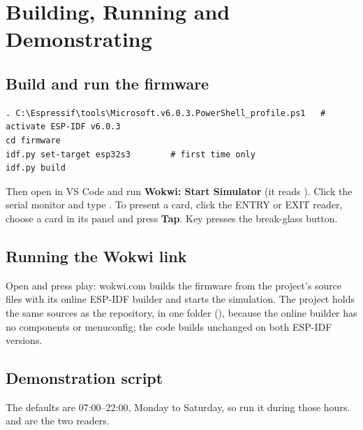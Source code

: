 \section{Building, Running and Demonstrating}
\label{app:build}

\subsection{Build and run the firmware}
\begin{lstlisting}[style=console]
. C:\Espressif\tools\Microsoft.v6.0.3.PowerShell_profile.ps1   # activate ESP-IDF v6.0.3
cd firmware
idf.py set-target esp32s3        # first time only
idf.py build
\end{lstlisting}
Then open  in VS Code and run \textbf{Wokwi: Start Simulator} (it reads
). Click the serial monitor and type . To present a card, click the
ENTRY or EXIT reader, choose a card in its panel and press \textbf{Tap}. Key  presses the
break-glass button.

\subsection{Running the Wokwi link}
\label{app:wokwi-link}
Open \wokwilink{} and press play: wokwi.com builds the firmware from the project's source files
with its online ESP-IDF builder and starts the simulation. The project holds the same sources as
the repository, in one folder (), because the online builder has no
components or menuconfig; the code builds unchanged on both ESP-IDF versions.

\subsection{Demonstration script}
The defaults are 07:00--22:00, Monday to Saturday, so run it during those hours.
 and  are the two readers.

